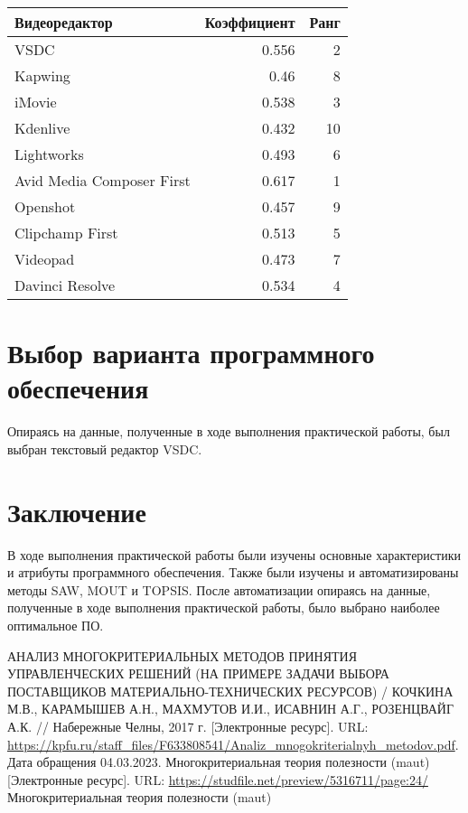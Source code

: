 \begin{table}[h!tp]
    \centering
    \caption{}
    \label{table:topsis:result}
    \begin{tabular}{|l|r|r|}
        \hline Видеоредактор & Коэффициент & Ранг\\ \hline
        VSDC & 0.556 & 2\\ \hline
        Kapwing & 0.46 & 8\\ \hline
        iMovie & 0.538 & 3\\ \hline
        Kdenlive & 0.432 & 10\\ \hline
        Lightworks & 0.493 & 6\\ \hline
        Avid Media Composer First & 0.617 & 1 \\ \hline
        Openshot & 0.457 & 9\\ \hline
        Clipchamp First & 0.513 & 5 \\ \hline
        Videopad & 0.473  & 7\\ \hline
        Davinci Resolve & 0.534 & 4 \\ \hline
    \end{tabular}
\end{table}

\section{Выбор варианта программного обеспечения}
Опираясь на данные, полученные в ходе выполнения практической
работы, был выбран текстовый редактор VSDC.

\clearpage

\section*{\LARGE Заключение}
В ходе выполнения практической работы были изучены основные характеристики и
атрибуты программного обеспечения. Также были изучены и
автоматизированы методы SAW, MOUT и TOPSIS. После автоматизации
опираясь на данные, полученные в ходе выполнения практической работы,
было выбрано наиболее оптимальное ПО.

\newpage

\begin{thebibliography}{0}
    АНАЛИЗ МНОГОКРИТЕРИАЛЬНЫХ МЕТОДОВ ПРИНЯТИЯ
    УПРАВЛЕНЧЕСКИХ РЕШЕНИЙ
    (НА ПРИМЕРЕ ЗАДАЧИ ВЫБОРА ПОСТАВЩИКОВ
    МАТЕРИАЛЬНО-ТЕХНИЧЕСКИХ РЕСУРСОВ) /
    КОЧКИНА М.В., КАРАМЫШЕВ А.Н., МАХМУТОВ И.И.,
    ИСАВНИН А.Г., РОЗЕНЦВАЙГ А.К. // Набережные Челны, 2017 г.
    [Электронные ресурс]. URL:
    \url{https://kpfu.ru/staff_files/F633808541/Analiz_mnogokriterialnyh_metodov.pdf}.
    Дата обращения 04.03.2023.
     Многокритериальная теория полезности (maut)
    [Электронные ресурс]. URL:
    \url{https://studfile.net/preview/5316711/page:24/}
     Многокритериальная теория полезности (maut)
\end{thebibliography}